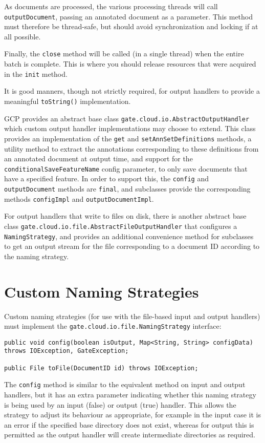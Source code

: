 As documents are processed, the various processing threads will call
\verb!outputDocument!, passing an annotated document as a parameter.  This
method must therefore be thread-safe, but should avoid synchronization and
locking if at all possible.

Finally, the \verb!close! method will be called (in a single thread) when the
entire batch is complete.  This is where you should release resources that were
acquired in the \verb!init! method.

It is good manners, though not strictly required, for output handlers to
provide a meaningful \verb!toString()! implementation.

GCP provides an abstract base class \verb!gate.cloud.io.AbstractOutputHandler!
which custom output handler implementations may choose to extend.  This class
provides an implementation of the \verb!get! and \verb!setAnnSetDefinitions!
methods, a utility method to extract the annotations corresponding to these
definitions from an annotated document at output time, and support for the
\verb!conditionalSaveFeatureName! config parameter, to only save documents
that have a specified feature.  In order to support this, the \verb!config!
and \verb!outputDocument! methods are \verb!final!, and subclasses provide
the corresponding methods \verb!configImpl! and \verb!outputDocumentImpl!.

For output handlers that write to files on disk, there is another abstract
base class \verb!gate.cloud.io.file.AbstractFileOutputHandler! that configures
a \verb!NamingStrategy!, and provides an additional convenience method for
subclasses to get an output stream for the file corresponding to a document ID
according to the naming strategy.

\section{Custom Naming Strategies}

Custom naming strategies (for use with the file-based input and output
handlers) must implement the \verb!gate.cloud.io.file.NamingStrategy!
interface:

\begin{lstlisting}[breaklines]
public void config(boolean isOutput, Map<String, String> configData) throws IOException, GateException;

public File toFile(DocumentID id) throws IOException;
\end{lstlisting}

The \verb!config! method is similar to the equivalent method on input and
output handlers, but it has an extra parameter indicating whether this naming
strategy is being used by an input (false) or output (true) handler.  This
allows the strategy to adjust its behaviour as appropriate, for example in the
input case it is an error if the specified base directory does not exist,
whereas for output this is permitted as the output handler will create
intermediate directories as required.

